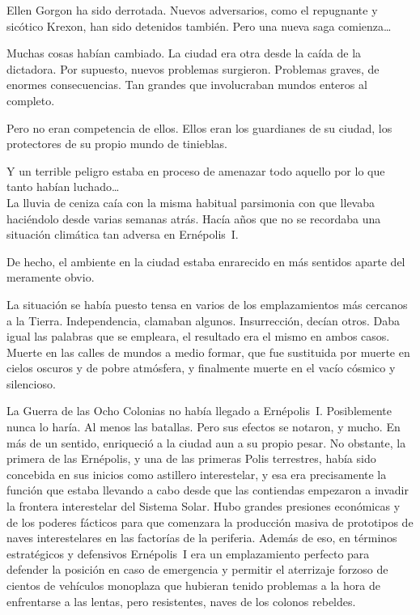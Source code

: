 \begin{prev}
    Ellen Gorgon ha sido derrotada. Nuevos adversarios, como el repugnante y sicótico Krexon, han sido detenidos también. Pero una nueva saga comienza\dots
\end{prev}

\noindent{}Muchas cosas habían cambiado. La ciudad era otra desde la caída de la dictadora. Por supuesto, nuevos problemas surgieron. Problemas graves, de enormes consecuencias. Tan grandes que involucraban mundos enteros al completo.

Pero no eran competencia de ellos. Ellos eran los guardianes de su ciudad, los protectores de su propio mundo de tinieblas.

Y un terrible peligro estaba en proceso de amenazar todo aquello por lo que tanto habían luchado\dots\\

\noindent{}La lluvia de ceniza caía con la misma habitual parsimonia con que llevaba haciéndolo desde varias semanas atrás. Hacía años que no se recordaba una situación climática tan adversa en Ernépolis~I.

De hecho, el ambiente en la ciudad estaba enrarecido en más sentidos aparte del meramente obvio.

La situación se había puesto tensa en varios de los emplazamientos más cercanos a la Tierra. Independencia, clamaban algunos. Insurrección, decían otros. Daba igual las palabras que se empleara, el resultado era el mismo en ambos casos. Muerte en las calles de mundos a medio formar, que fue sustituida por muerte en cielos oscuros y de pobre atmósfera, y finalmente muerte en el vacío cósmico y silencioso.

La Guerra de las Ocho Colonias no había llegado a Ernépolis~I. Posiblemente nunca lo haría. Al menos las batallas. Pero sus efectos se notaron, y mucho. En más de un sentido, enriqueció a la ciudad aun a su propio pesar. No obstante, la primera de las Ernépolis, y una de las primeras Polis terrestres, había sido concebida en sus inicios como astillero interestelar, y esa era precisamente la función que estaba llevando a cabo desde que las contiendas empezaron a invadir la frontera interestelar del Sistema Solar. Hubo grandes presiones económicas y de los poderes fácticos para que comenzara la producción masiva de prototipos de naves interestelares en las factorías de la periferia. Además de eso, en términos estratégicos y defensivos Ernépolis~I era un emplazamiento perfecto para defender la posición en caso de emergencia y permitir el aterrizaje forzoso de cientos de vehículos monoplaza que hubieran tenido problemas a la hora de enfrentarse a las lentas, pero resistentes, naves de los colonos rebeldes.

